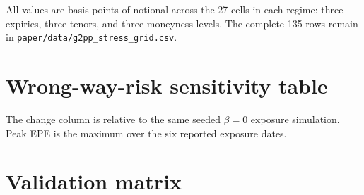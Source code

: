 \documentclass[11pt]{article}
\numberwithin{equation}{section}
\theoremstyle{definition}
\theoremstyle{remark}
\begin{document}
\begin{center}
  \small
  
\end{center}
All values are basis points of notional across the 27 cells in each regime:
three expiries, three tenors, and three moneyness levels. The complete 135 rows
remain in \texttt{paper/data/g2pp\_stress\_grid.csv}.

\section{Wrong-way-risk sensitivity table}
\label{app:wwr-table}

\begin{center}
  \small
  
\end{center}
The change column is relative to the same seeded $\beta=0$ exposure simulation.
Peak EPE is the maximum over the six reported exposure dates.

\section{Validation matrix}
\label{app:validation}
\end{document}
